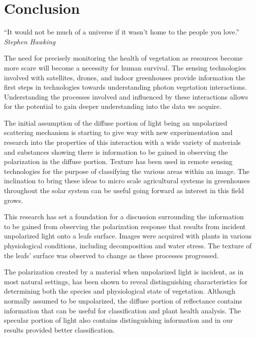 \chapter{Conclusion}
\begin{center}
  \begin{minipage}{0.75\textwidth}
    \begin{small}
      “It would not be much of a universe if it wasn't home to the people you love.”\\
      \null\hfill\emph{Stephen Hawking}
    \end{small}
  \end{minipage}
  \vspace{0.5cm}
\end{center}

The need for precisely monitoring the health of vegetation as resources become more scare will become a necessity for human survival. The sensing technologies involved with satellites, drones, and indoor greenhouses  provide information the first steps in technologies towards understanding photon vegetation interactions.  Understanding the processes involved and influenced by these interactions allows for the potential to gain deeper understanding into the data we acquire.

The initial assumption of the diffuse portion of light being an unpolarized scattering mechanism is starting to give way with new experimentation and research into the properties of this interaction with a wide variety of materials and substances showing there is information to be gained in observing the polarization in the diffuse portion.  Texture has been used in remote sensing technologies for the purpose of classifying the various areas within an image.  The inclination to bring these ideas to micro scale agricultural systems in greenhouses throughout the solar system can be useful going forward as interest in this field grows.

This research has set a foundation for a discussion surrounding the information to be gained from observing the polarization response that results from incident unpolarized light onto a leafs surface. Images were acquired with plants in various physiological conditions, including decomposition and water stress.  The texture of the leafs' surface was observed to change as these processes progressed.

The polarization created by a material when unpolarized light is incident, as in most natural settings, has been shown to reveal distinguishing characteristics for determining both the species and physiological state of vegetation.  Although normally assumed to be unpolarized, the diffuse portion of reflectance contains information that can be useful for classification and plant health analysis.  The specular portion of light also contains distinguishing information and in our results provided better classification.

